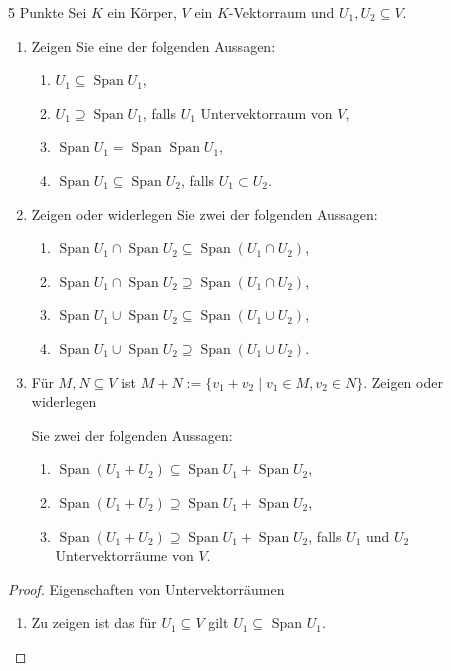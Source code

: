 \documentclass{problemset}
\begin{document}
\begin{problem}{5 Punkte}
Sei $K$ ein Körper, $V$ ein $K$-Vektorraum und $U_1, U_2 \subseteq V$.
\begin{enumerate}
    \item Zeigen Sie eine der folgenden Aussagen:
          \begin{enumerate}[label=\alph*)]
              \item $U_1 \subseteq \operatorname{Span} U_1$,
              \item $U_1 \supseteq \operatorname{Span} U_1$, falls $U_1$ Untervektorraum von $V$,
              \item $\operatorname{Span} U_1 = \operatorname{Span} \operatorname{Span} U_1$,
              \item $\operatorname{Span} U_1 \subseteq \operatorname{Span} U_2$, falls $U_1 \subset U_2$.
          \end{enumerate}
    \item Zeigen oder widerlegen Sie zwei der folgenden Aussagen:
          \begin{enumerate}[label=\alph*)]
              \item $\operatorname{Span} U_1 \cap \operatorname{Span} U_2 \subseteq \operatorname{Span}(U_1 \cap U_2)$,
              \item $\operatorname{Span} U_1 \cap \operatorname{Span} U_2 \supseteq \operatorname{Span}(U_1 \cap U_2)$,
              \item $\operatorname{Span} U_1 \cup \operatorname{Span} U_2 \subseteq \operatorname{Span}(U_1 \cup U_2)$,
              \item $\operatorname{Span} U_1 \cup \operatorname{Span} U_2 \supseteq \operatorname{Span}(U_1 \cup U_2)$.
          \end{enumerate}
    \item Für $M, N \subseteq V$ ist $M + N := \{v_1 + v_2 \mid v_1 \in M, v_2
          \in N\}$. Zeigen oder widerlegen

          Sie zwei der folgenden Aussagen:
          \begin{enumerate}[label=\alph*)]
              \item $\operatorname{Span}(U_1 + U_2) \subseteq \operatorname{Span} U_1 + \operatorname{Span} U_2$,
              \item $\operatorname{Span}(U_1 + U_2) \supseteq \operatorname{Span} U_1 + \operatorname{Span} U_2$,
              \item $\operatorname{Span}(U_1 + U_2) \supseteq \operatorname{Span} U_1 + \operatorname{Span} U_2$, falls $U_1$ und $U_2$ Untervektorräume von $V$.
          \end{enumerate}
\end{enumerate}
\begin{proof}
    Eigenschaften von Untervektorräumen
    \begin{enumerate}
        \item Zu zeigen ist das für $U_1 \subseteq V$ gilt $U_1 \subseteq$ Span
              $U_1$.


\end{enumerate}
\end{proof}
\end{problem}
\end{document}
